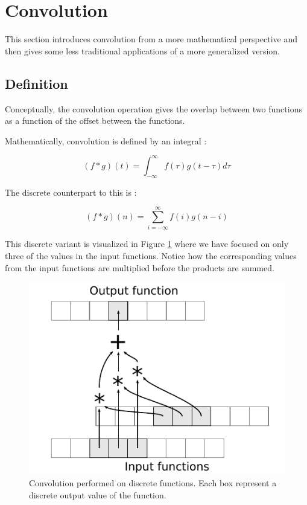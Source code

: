 \section{Convolution}
This section introduces convolution from a more mathematical perspective and then gives some less traditional applications of a more generalized version.

\subsection{Definition}
Conceptually, the convolution operation gives the overlap between two functions as a function of the offset between the functions.

Mathematically, convolution is defined by an integral \cite{convolution1}:

\[
    (f * g)(t) = \int^{\infty}_{-\infty}{f(\tau)g(t-\tau) d\tau}
\]

The discrete counterpart to this is \cite{convolution2}:

\[
    (f * g)(n) = \sum^{\infty}_{i=-\infty}{f(i)g(n-i)}
\]

This discrete variant is visualized in Figure \ref{fig:VisualConvolution} where we have focused on only three of the values in the input functions.
Notice how the corresponding values from the input functions are multiplied before the products are summed.

\begin{figure}
    \centering
    \includegraphics{img/VisualConvolution}
    \caption{
        Convolution performed on discrete functions.
        Each box represent a discrete output value of the function.
    }
    \label{fig:VisualConvolution}
\end{figure}

